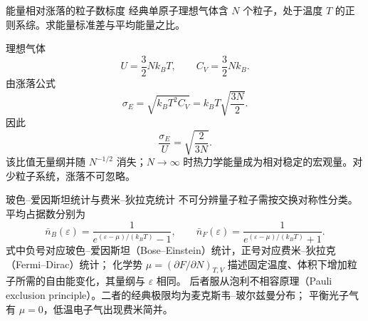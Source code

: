 \begin{origexamplebox}{能量相对涨落的粒子数标度}
经典单原子理想气体含 $N$ 个粒子，处于温度 $T$ 的正则系综。求能量标准差与平均能量之比。
\end{origexamplebox}
\begin{xesolution}
理想气体
\[
 U=\frac32Nk_BT,
 \qquad C_V=\frac32Nk_B.
\]
由涨落公式
\[
 \sigma_E=\sqrt{k_BT^2C_V}=k_BT\sqrt{\frac{3N}{2}}.
\]
因此
\[
 \boxed{\frac{\sigma_E}{U}=\sqrt{\frac{2}{3N}}}.
\]
该比值无量纲并随 $N^{-1/2}$ 消失；$N\to\infty$ 时热力学能量成为相对稳定的宏观量。对少粒子系统，涨落不可忽略。
\end{xesolution}



\begin{starread}{玻色--爱因斯坦统计与费米--狄拉克统计}
不可分辨量子粒子需按交换对称性分类。平均占据数分别为
\[
 \bar n_B(\varepsilon)=\frac1{e^{(\varepsilon-\mu)/(k_BT)}-1},\qquad
 \bar n_F(\varepsilon)=\frac1{e^{(\varepsilon-\mu)/(k_BT)}+1}.
\]
式中负号对应玻色--爱因斯坦（Bose--Einstein）统计，正号对应费米--狄拉克（Fermi--Dirac）统计；
化学势 $\mu=(\partial F/\partial N)_{T,V}$ 描述固定温度、体积下增加粒子所需的自由能变化，其量纲与 $\varepsilon$ 相同。
后者服从泡利不相容原理（Pauli exclusion principle）。二者的经典极限均为麦克斯韦--玻尔兹曼分布；
平衡光子气有 $\mu=0$，低温电子气出现费米简并。
\end{starread}
